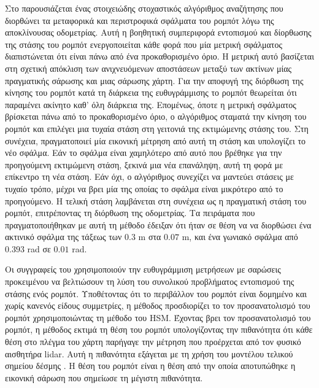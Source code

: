 Στο \cite{Sandberg2009a} παρουσιάζεται ένας στοιχειώδης στοχαστικός αλγόριθμος
αναζήτησης που διορθώνει τα μεταφορικά και περιστροφικά σφάλματα του ρομπότ
λόγω της αποκλίνουσας οδομετρίας.  Αυτή η βοηθητική συμπεριφορά εντοπισμού και
δίορθωσης της στάσης του ρομπότ ενεργοποιείται κάθε φορά που μία μετρική
σφάλματος διαπιστώνεται ότι είναι πάνω από ένα προκαθορισμένο όριο. Η μετρική
αυτό βασίζεται στη σχετική απόκλιση των ανιχνευόμενων αποστάσεων μεταξύ των
ακτίνων μίας πραγματικής σάρωσης και μιας σάρωσης χάρτη. Για την αποφυγή της
διόρθωση της κίνησης του ρομπότ κατά τη διάρκεια της ευθυγράμμισης το ρομπότ
θεωρείται ότι παραμένει ακίνητο καθ' όλη διάρκεια της. Επομένως, όποτε η
μετρική σφάλματος βρίσκεται πάνω από το προκαθορισμένο όριο, ο αλγόριθμος
σταματά την κίνηση του ρομπότ και επιλέγει μια τυχαία στάση στη γειτονιά της
εκτιμώμενης στάσης του. Στη συνέχεια, πραγματοποιεί μία εικονική μέτρηση από
αυτή τη στάση και υπολογίζει το νέο σφάλμα. Εάν το σφάλμα είναι χαμηλότερο από
αυτό που βρέθηκε για την προηγούμενη εκτιμώμενη στάση, ξεκινά μια νέα
επανάληψη, αυτή τη φορά με επίκεντρο τη νέα στάση. Εάν όχι, ο αλγόριθμος
συνεχίζει να μαντεύει στάσεις με τυχαίο τρόπο, μέχρι να βρει μία της οποίας το
σφάλμα είναι μικρότερο από το προηγούμενο. Η τελική στάση λαμβάνεται στη
συνέχεια ως η πραγματική στάση του ρομπότ, επιτρέποντας τη διόρθωση της
οδομετρίας. Τα πειράματα που πραγματοποιήθηκαν με αυτή τη μέθοδο έδειξαν ότι
ήταν σε θέση να να διορθώσει ένα ακτινικό σφάλμα της τάξεως των $0.3$ m στα
$0.07$ m, και ένα γωνιακό σφάλμα από $0.393$ rad σε $0.01$ rad.

Οι συγγραφείς του \cite{Zhu2011a} χρησιμοποιούν την ευθυγράμμιση μετρήσεων με
σαρώσεις προκειμένου να βελτιώσουν τη λύση του συνολικού προβλήματος εντοπισμού
της στάσης ενός ρομπότ. Υποθέτοντας ότι το περιβάλλον του ρομπότ είναι δομημένο
και χωρίς κανενός είδους συμμετρίες, η μέθοδος προσδιορίζει το τον
προσανατολισμό του ρομπότ χρησιμοποιώντας τη μέθοδο του HSM. Έχοντας βρει τον
προσανατολισμό του ρομπότ, η μέθοδος εκτιμά τη θέση του ρομπότ υπολογίζοντας
την πιθανότητα ότι κάθε θέση στο πλέγμα του χάρτη παρήγαγε την μέτρηση που
προέρχεται από τον φυσικό αισθητήρα lidar. Αυτή η πιθανότητα εξάγεται με τη
χρήση του μοντέλου τελικού σημείου δέσμης \cite{thrun2005probabilistic}. Η θέση
του ρομπότ είναι η θέση από την οποία αποτυπώθηκε η εικονική σάρωση που
σημείωσε τη μέγιστη πιθανότητα.

